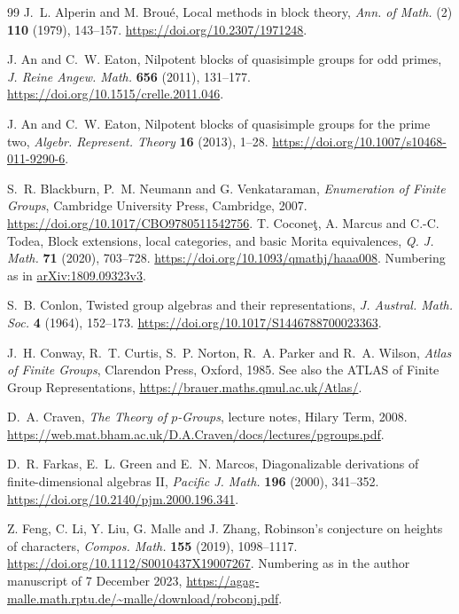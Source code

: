 \documentclass[11pt,a4paper]{article}
\theoremstyle{definition}
\theoremstyle{remark}
\numberwithin{equation}{section}
\begin{document}
	
	\begin{thebibliography}{99}
		\small
		 J.~L. Alperin and M. Brou\'e, Local methods in block theory, \textit{Ann. of Math.} (2) \textbf{110} (1979), 143--157. \url{https://doi.org/10.2307/1971248}.
		
		 J. An and C.~W. Eaton, Nilpotent blocks of quasisimple groups for odd primes, \textit{J. Reine Angew. Math.} \textbf{656} (2011), 131--177. \url{https://doi.org/10.1515/crelle.2011.046}.
		
		 J. An and C.~W. Eaton, Nilpotent blocks of quasisimple groups for the prime two, \textit{Algebr. Represent. Theory} \textbf{16} (2013), 1--28. \url{https://doi.org/10.1007/s10468-011-9290-6}.
		
		 S.~R. Blackburn, P.~M. Neumann and G. Venkataraman, \textit{Enumeration of Finite Groups}, Cambridge University Press, Cambridge, 2007. \url{https://doi.org/10.1017/CBO9780511542756}.
		 T. Cocone\c{t}, A. Marcus and C.-C. Todea, Block extensions, local categories, and basic Morita equivalences, \textit{Q. J. Math.} \textbf{71} (2020), 703--728. \url{https://doi.org/10.1093/qmathj/haaa008}. Numbering as in \href{https://arxiv.org/abs/1809.09323v3}{arXiv:1809.09323v3}.
		
		 S.~B. Conlon, Twisted group algebras and their representations, \textit{J. Austral. Math. Soc.} \textbf{4} (1964), 152--173. \url{https://doi.org/10.1017/S1446788700023363}.
		
		 J.~H. Conway, R.~T. Curtis, S.~P. Norton, R.~A. Parker and R.~A. Wilson,
		\textit{Atlas of Finite Groups}, Clarendon Press, Oxford, 1985.
		See also the ATLAS of Finite Group Representations,
		\url{https://brauer.maths.qmul.ac.uk/Atlas/}.
		
		 D.~A. Craven, \textit{The Theory of $p$-Groups}, lecture notes, Hilary Term, 2008. \url{https://web.mat.bham.ac.uk/D.A.Craven/docs/lectures/pgroups.pdf}.
		
		 D.~R. Farkas, E.~L. Green and E.~N. Marcos, Diagonalizable derivations of finite-dimensional algebras II, \textit{Pacific J. Math.} \textbf{196} (2000), 341--352. \url{https://doi.org/10.2140/pjm.2000.196.341}.
		
		 Z. Feng, C. Li, Y. Liu, G. Malle and J. Zhang, Robinson's conjecture on heights of characters, \textit{Compos. Math.} \textbf{155} (2019), 1098--1117. \url{https://doi.org/10.1112/S0010437X19007267}. Numbering as in the author manuscript of 7 December 2023, \url{https://agag-malle.math.rptu.de/~malle/download/robconj.pdf}.
		

\end{thebibliography}
\end{document}
